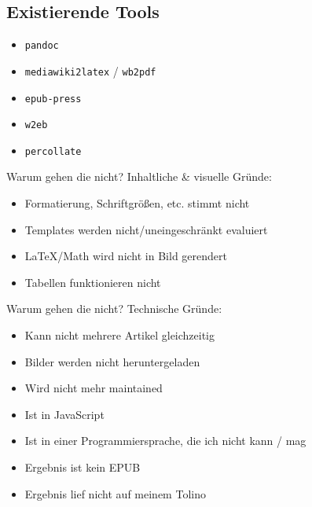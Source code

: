 \documentclass{beamer}
\begin{document}
	\subsection{Existierende Tools}
	
	\begin{frame}
		\begin{itemize}
			\item \texttt{pandoc}
			\item \texttt{mediawiki2latex} / \texttt{wb2pdf}
			\item \texttt{epub-press}
			\item \texttt{w2eb}
			\item \texttt{percollate}
		\end{itemize}
	\end{frame}

	\begin{frame}{Warum gehen die nicht?}
		Inhaltliche \& visuelle Gründe:
		\begin{itemize}
			\item Formatierung, Schriftgrößen, etc. stimmt nicht
			\item Templates werden nicht/uneingeschränkt evaluiert
			\item LaTeX/Math wird nicht in Bild gerendert
			\item Tabellen funktionieren nicht
		\end{itemize}
	\end{frame}

	\begin{frame}{Warum gehen die nicht?}
		Technische Gründe:
		\begin{itemize}
			\item Kann nicht mehrere Artikel gleichzeitig
			\item Bilder werden nicht heruntergeladen
			\item Wird nicht mehr maintained
			\item Ist in JavaScript
			\item Ist in einer Programmiersprache, die ich nicht kann / mag
			\item Ergebnis ist kein EPUB
			\item Ergebnis lief nicht auf meinem Tolino
		\end{itemize}
	\end{frame}
	
\end{document}
